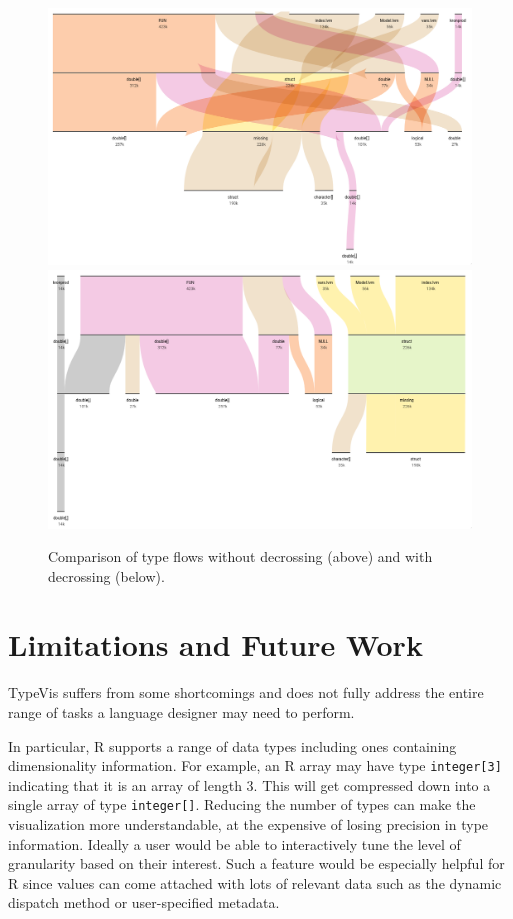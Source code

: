 \documentclass{vgtc}                          %
\newcommand{\typevis}{{\sc TypeVis}\xspace}
\begin{document}
\begin{figure}[tb]
 \centering
 \includegraphics[width=\columnwidth]{img/no_decross.png}
 \includegraphics[width=\columnwidth]{img/decross.png}
 \caption{Comparison of type flows without decrossing (above) and with decrossing (below).}
 \label{fig:decross}
\end{figure}


\section{Limitations and Future Work}

\typevis suffers from some shortcomings
and does not fully address the entire range of tasks
a language designer may need to perform.

In particular, R supports a range of data types
including ones containing dimensionality information.
For example, an R array may have type {\tt integer[3]}
indicating that it is an array of length $3$.
This will get compressed down into a single array of
type {\tt integer[]}.
Reducing the number of types can make the visualization
more understandable, at the expensive of losing
precision in type information.
Ideally a user would be able to interactively tune
the level of granularity based on their interest.
Such a feature would be especially helpful for R
since values can come attached with lots of relevant
data such as the dynamic dispatch method
or user-specified metadata.
\end{document}
